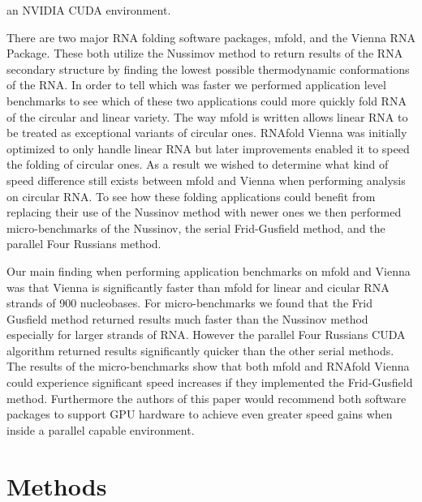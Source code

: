 \documentclass[12pt]{article}
\begin{document}
an NVIDIA CUDA environment\cite{balaji}.
\par There are two major RNA folding software packages, mfold\cite{zuker1989,zuker1981},
and the Vienna RNA Package\cite{vienna}. These both utilize the Nussimov method
to return results of the RNA secondary structure by finding the lowest possible
thermodynamic conformations of the RNA\cite{zuker1981,vienna}. In order to tell
which was faster we performed application level benchmarks\cite{eulogy} to see
which of these two applications could more quickly fold RNA of
the circular and linear variety. The way mfold is written allows linear RNA to
be treated as exceptional variants of circular ones\cite{circular}. RNAfold
Vienna was initially optimized to only handle linear RNA\cite{circular} but
later improvements enabled it to speed the folding of circular ones\cite{circular}.
As a result we wished to determine what kind of speed difference still exists
between mfold and Vienna when performing analysis on circular RNA. To see how
these folding applications could benefit from replacing their use of the Nussinov
method with newer ones we then performed micro-benchmarks\cite{sysperformance} of the Nussinov,
the serial Frid-Gusfield method, and the parallel Four Russians method.

\par Our main finding when performing application benchmarks on mfold and
Vienna was that Vienna is significantly faster than mfold for linear and cicular
RNA strands of 900 nucleobases. For micro-benchmarks we found that the Frid Gusfield method
returned results much faster than the Nussinov method especially for larger strands of RNA. However
the parallel Four Russians CUDA algorithm returned results significantly quicker than the other serial
methods. The results of the micro-benchmarks show that both mfold and RNAfold Vienna could experience
significant speed increases if they implemented the Frid-Gusfield method. Furthermore
the authors of this paper would recommend both software packages to support GPU
hardware to achieve even greater speed gains when inside a parallel capable
environment.

\section{Methods}
\end{document}
